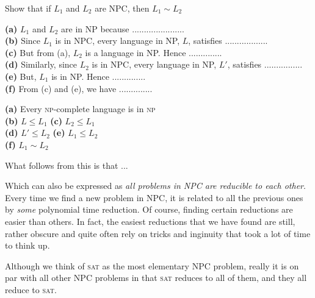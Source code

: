\frmrule

\begin{example}
Show that if $L_1$ and $L_2$ are NPC, then $L_1 \sim L_2$

\textbf{(a)} $L_1$ and $L_2$ are in NP because ...................... \\ 
\textbf{(b)} Since $L_1$ is in NPC, every language in NP, $L$, satisfies .................. \\
\textbf{(c)} But from (a), $L_2$ is a language in NP. Hence .............. \\
\textbf{(d)} Similarly, since $L_2$ is in NPC, every language in NP, $L'$, satisfies ................ \\
\textbf{(e)} But, $L_1$ is in NP. Hence .............. \\
\textbf{(f)} From (c) and (e), we have ..............
\end{example}

{
\textbf{(a)} Every \textsc{np}-complete language is in \textsc{np} \\
\textbf{(b)} $L \leqslant L_1$ 
\textbf{(c)} $L_2 \leqslant L_1$ \\
\textbf{(d)} $L' \leqslant L_2$ 
\textbf{(e)} $L_1 \leqslant L_2$ \\
\textbf{(f)} $L_1 \sim L_2$
}


What follows from this is that ...


Which can also be expressed as \textit{all problems in NPC are reducible to each other}. 
Every time we find a new problem in NPC, it is related to all the 
previous ones by \textit{some} polynomial time reduction. 
Of course, finding certain reductions are easier than others. 
In fact, the easiest reductions that we have found are still, rather 
obscure and quite often rely on tricks and inginuity that 
took a lot of time to think up.

Although we think of \textsc{sat} as the most elementary NPC problem, 
really it is on par with all other NPC problems in that \textsc{sat} reduces to 
all of them, and they all reduce to \textsc{sat}. 

\frmrule

